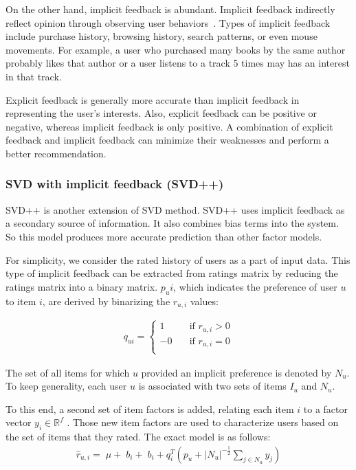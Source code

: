 \documentclass[oneside,13pt]{extreport}
\begin{document}
 On the other hand, implicit feedback is abundant. Implicit feedback indirectly reflect opinion through observing user behaviors~\cite{Oard98}. Types of implicit feedback include purchase history, browsing history, search patterns, or even mouse movements. For
example, a user who purchased many books by the same author probably likes that
author or  a user listens to a track 5 times may has an interest in that track.

Explicit feedback is generally more accurate than implicit feedback in representing the user’s interests. Also, explicit feedback can be positive or negative, whereas implicit feedback is only positive. A combination of explicit feedback and implicit feedback can minimize their weaknesses and perform a better recommendation.

\subsubsection{SVD with implicit feedback (SVD++)}
SVD++ is another extension of SVD method. SVD++ uses implicit feedback as a secondary source of information. It also combines bias terms into the system. So this model produces more accurate prediction than other factor models. 

For simplicity, we consider the rated history of users as a part of input data. This type of implicit feedback can be extracted from ratings matrix by reducing the ratings matrix into a binary matrix. $p_ui$, which indicates the preference of user $u$ to item $i$, are derived by binarizing the $r_{u,i}$ values:

\begin{eqnarray}
\label{eq:implicit_binary}
q_{ui} = \begin{cases} 1 & \quad \text{if } r_{u,i} > 0\\ -0 & \quad \text{if } r_{u,i} = 0\\ \end{cases}
\end{eqnarray}

The set of all items for which $u$ provided an implicit preference is denoted by $N_u$. To keep generality, each user $u$ is associated with two sets of items $I_u$ and $N_u$.

To this end, a second set of item factors is added, relating each item $i$ to a factor
vector ${y_i} \in {\mathbb{R}^f}$ . Those new item factors are used to characterize users based on the
set of items that they rated. The exact model is as follows:
\begin{eqnarray}
\label{eq:svd++_pre}
{\hat r_{u,i}} = \;\mu  + \;{b_i} + \;{b_i} + q_i^T\left( {{p_u} + {{\left| {{N_u}} \right|}^{ - \frac{1}{2}}}\sum\limits_{j \in  {N_u}} {{y_j}} } \right)
\end{eqnarray}
\end{document}
